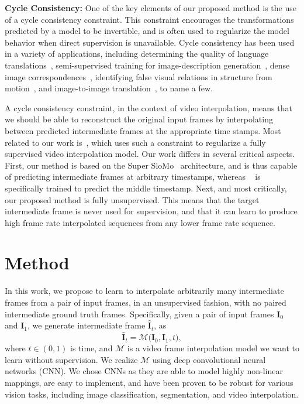 \documentclass[10pt,twocolumn,letterpaper]{article}
\begin{document}
\noindent\textbf{Cycle Consistency:}
One of the key elements of our proposed method is the use of a cycle consistency constraint. This constraint encourages the transformations predicted by a model to be invertible, and is often used to regularize the model behavior when direct supervision is unavailable. Cycle consistency has been used in a variety of applications, including determining the quality of language translations~\cite{brislin1970back}, semi-supervised training for image-description generation~\cite{mao2016generation}, dense image correspondences~\cite{zhou2016learning}, identifying false visual relations in structure from motion~\cite{zach2010disambiguating}, and image-to-image translation~\cite{zhu2017unpaired}, to name a few.


A cycle consistency constraint, in the context of video interpolation, means that we should be able to reconstruct the original input frames by interpolating between predicted intermediate frames at the appropriate time stamps. Most related to our work is~\cite{liu2019deep}, which uses such a constraint to regularize a fully supervised video interpolation model. Our work differs in several critical aspects. First, our method is based on the Super SloMo~\cite{jiang2018super} architecture, and is thus capable of predicting intermediate frames at arbitrary timestamps, whereas ~\cite{liu2019deep} is specifically trained to predict the middle timestamp. Next, and most critically, our proposed method is fully unsupervised. This means that the target intermediate frame is never used for supervision, and that it can learn to produce high frame rate interpolated sequences from any lower frame rate sequence. 
\section{Method}\label{Methodology}
In this work, we propose to learn to interpolate arbitrarily many intermediate frames from a pair of input frames, in an unsupervised fashion, with no paired intermediate ground truth frames. Specifically, given a pair of input frames $\textbf{I}_{0}$ and $\textbf{I}_{1}$, we generate intermediate frame $\hat{\textbf{I}}_{t}$, as \begin{equation} \label{eq:1}
\hat{\textbf{I}}_{t} = \mathcal{M}\big(\textbf{I}_{0},\textbf{I}_{1},t\big), \end{equation} 
where $t\in(0,1)$ is time, and $\mathcal{M}$ is a video frame interpolation model we want to learn without supervision. We realize $\mathcal{M}$ using deep convolutional neural networks (CNN). We chose CNNs as they are able to model highly non-linear mappings, are easy to implement, and have been proven to be robust for various vision tasks, including image classification, segmentation, and video interpolation.
\end{document}
